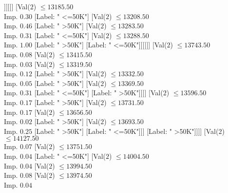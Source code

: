 \documentclass[margin=10pt]{standalone}
\begin{document}
\begin{forest}
																												[Label: " >50K"]
																												[Label: " <=50K"]]]]]]
																							[Val($2$) $ \leq 13185.50$ \\ Imp. $0.30$
																								[Label: " <=50K"]
																								[Val($2$) $ \leq 13208.50$ \\ Imp. $0.46$
																									[Label: " >50K"]
																									[Val($2$) $ \leq 13283.50$ \\ Imp. $0.31$
																										[Label: " <=50K"]
																										[Val($2$) $ \leq 13288.50$ \\ Imp. $1.00$
																											[Label: " >50K"]
																											[Label: " <=50K"]]]]]]
																						[Val($2$) $ \leq 13743.50$ \\ Imp. $0.08$
																							[Val($2$) $ \leq 13415.50$ \\ Imp. $0.03$
																								[Val($2$) $ \leq 13319.50$ \\ Imp. $0.12$
																									[Label: " >50K"]
																									[Val($2$) $ \leq 13332.50$ \\ Imp. $0.05$
																										[Label: " >50K"]
																										[Val($2$) $ \leq 13369.50$ \\ Imp. $0.31$
																											[Label: " <=50K"]
																											[Label: " >50K"]]]]
																								[Val($2$) $ \leq 13596.50$ \\ Imp. $0.17$
																									[Label: " >50K"]
																									[Val($2$) $ \leq 13731.50$ \\ Imp. $0.17$
																										[Val($2$) $ \leq 13656.50$ \\ Imp. $0.02$
																											[Label: " >50K"]
																											[Val($2$) $ \leq 13693.50$ \\ Imp. $0.25$
																												[Label: " >50K"]
																												[Label: " <=50K"]]]
																										[Label: " >50K"]]]]
																							[Val($2$) $ \leq 14127.50$ \\ Imp. $0.07$
																								[Val($2$) $ \leq 13751.50$ \\ Imp. $0.04$
																									[Label: " <=50K"]
																									[Val($2$) $ \leq 14004.50$ \\ Imp. $0.04$
																										[Val($2$) $ \leq 13994.50$ \\ Imp. $0.08$
																											[Val($2$) $ \leq 13974.50$ \\ Imp. $0.04$

\end{forest}
\end{document}
